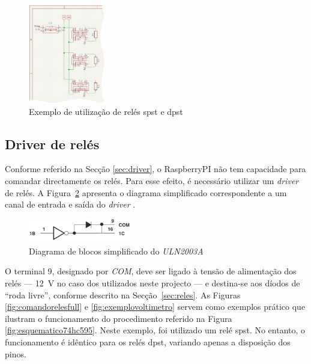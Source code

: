 \begin{figure}[hbtp]
	\centering
	\includegraphics[width=0.3\textwidth]{figures/exemplo_reles_spst.png}
	\caption{Exemplo de utilização de relés \acrshort{spst} e \acrshort{dpst}}
	\label{fig:relespstdpst}
\end{figure}

\subsection{Driver de relés}
\label{sec:driverreles}
Conforme referido na Secção \ref{sec:driver}, o \gls{RaspberryPI} não tem capacidade para comandar directamente os relés. Para esse efeito, é necessário utilizar um \textit{driver} de relés. A Figura~\ref{fig:diagramablocos2003} apresenta o diagrama simplificado correspondente a um canal de entrada e saída do \textit{driver} \cite{ULN2003}.

\begin{figure}[hbtp]
	\centering
	\includegraphics[width=0.4\textwidth]{figures/uln2003_diagramablocos.png}
	\caption{Diagrama de blocos simplificado do \textit{ULN2003A}}
	\label{fig:diagramablocos2003}
\end{figure}

O terminal 9, designado por \textit{COM}, deve ser ligado à tensão de alimentação dos relés — \SI{12}{\volt} no caso dos utilizados neste projecto — e destina-se aos díodos de ``roda livre'', conforme descrito na Secção~\ref{sec:reles}. As Figuras \ref{fig:comandorelesfull} e \ref{fig:exemplovoltimetro} servem como exemplos prático que ilustram o funcionamento do procedimento referido na Figura \ref{fig:esquematico74hc595}. Neste exemplo, foi utilizado um relé \acrshort{spst}. No entanto, o funcionamento é idêntico para os relés \acrshort{dpst}, variando apenas a disposição dos pinos.

